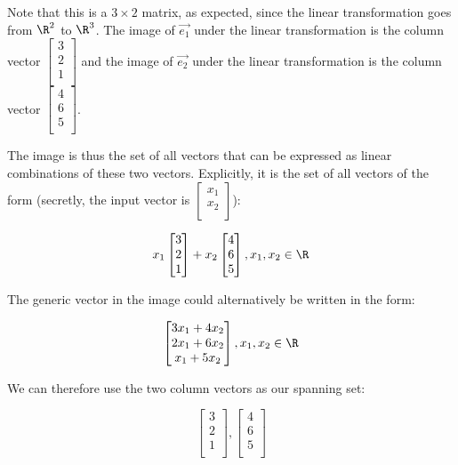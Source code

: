 \documentclass[10pt]{amsart}
\begin{document}
Note that this is a $3 \times 2$ matrix, as expected, since the linear
transformation goes from $\R^2$ to $\R^3$. The image of $\vec{e_1}$
under the linear transformation is the column vector
$\left[\begin{matrix} 3 \\ 2 \\ 1 \\\end{matrix}\right]$ and the image
of $\vec{e_2}$ under the linear transformation is the column vector
$\left[ \begin{matrix} 4 \\ 6 \\ 5 \\\end{matrix}\right]$.

The image is thus the set of all vectors that can be expressed as
linear combinations of these two vectors. Explicitly, it is the set of
all vectors of the form (secretly, the input vector is
$\left[ \begin{matrix} x_1 \\ x_2 \\\end{matrix}\right]$):

$$x_1 \left[\begin{matrix} 3 \\ 2 \\ 1 \\\end{matrix}\right] + x_2 \left[ \begin{matrix} 4 \\ 6 \\ 5 \\\end{matrix}\right], x_1, x_2 \in \R$$

The generic vector in the image could alternatively be written in the form:

$$\left[ \begin{matrix} 3x_1 + 4x_2 \\ 2x_1 + 6x_2 \\ x_1 + 5x_2 \\\end{matrix}\right], x_1, x_2 \in \R$$

We can therefore use the two column vectors as our spanning set:

$$ \left[\begin{matrix} 3 \\ 2 \\ 1 \\\end{matrix}\right], \left[ \begin{matrix} 4 \\ 6 \\ 5 \\\end{matrix}\right]$$
\end{document}
